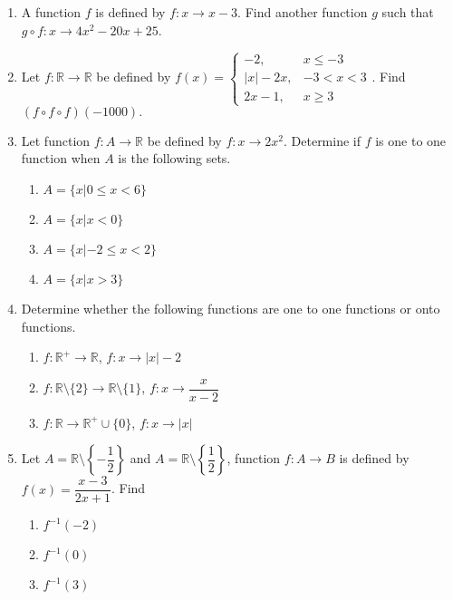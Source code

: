 \documentclass[12pt]{report}
\begin{document}
\begin{multicols}{2}
\begin{enumerate}
    \item A function $f$ is defined by $f: x \to x - 3$. Find another function $g$ such
          that $g\circ f: x\to 4x^2 - 20x + 25$.

    \item Let $f: \mathbb{R} \to \mathbb{R}$ be defined by $f(x) = \left\{\begin{array}{rl}
              -2,       & x\leq -3   \\
              |x| - 2x, & -3 < x < 3 \\
              2x - 1,   & x \geq 3
            \end{array}\right.$. Find $(f \circ f \circ f)(-1000).$

    \item Let function $f: A \to \mathbb{R}$ be defined by $f: x \to 2x^2$. Determine if
          $f$ is one to one function when $A$ is the following sets.
          \begin{enumerate}
            \item $A = \big\{x | 0 \leq x < 6\big\}$
            \item $A = \big\{x | x < 0\big\}$
            \item $A = \big\{x | -2 \leq x < 2\big\}$
            \item $A = \big\{x | x > 3\big\}$
          \end{enumerate}

    \item Determine whether the following functions are one to one functions or onto
          functions.
          \begin{enumerate}
            \item $f: \mathbb{R}^+ \to \mathbb{R}$, $f:x \to |x|-2$
            \item $f: \mathbb{R}\setminus\big\{2\big\} \to \mathbb{R}\setminus\big\{1\big\}$, $f:x \to \dfrac{x}{x-2}$
            \item $f: \mathbb{R} \to \mathbb{R}^+\cup\big\{0\big\}$, $f:x \to |x|$
          \end{enumerate}

    \item Let $A = \mathbb{R} \setminus \left\{-\dfrac{1}{2}\right\}$ and $A = \mathbb{R}
            \setminus \left\{\dfrac{1}{2}\right\}$, function $f: A \to B$ is defined by
          $f(x) = \dfrac{x-3}{2x + 1}$. Find
          \begin{enumerate}
            \item $f^{-1}(-2)$
            \item $f^{-1}(0)$
            \item $f^{-1}(3)$
          \end{enumerate}


\end{enumerate}
\end{multicols}
\end{document}
